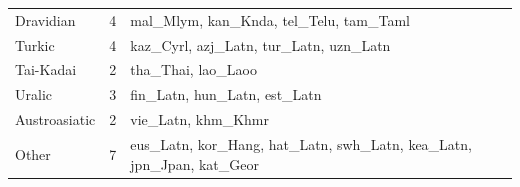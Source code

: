 \begin{table}[tbp]
{\begin{tabular}{@{}lcl@{}}
Dravidian       & 4        & mal\_Mlym, kan\_Knda, tel\_Telu, tam\_Taml                                                                                                                                                                                                                                                                       \\
Turkic          & 4        & kaz\_Cyrl, azj\_Latn, tur\_Latn, uzn\_Latn                                                                                                                                                                                                                                                                        \\
Tai-Kadai       & 2        & tha\_Thai, lao\_Laoo                                                                                                                                                                                                                                                                                               \\
Uralic          & 3        & fin\_Latn, hun\_Latn, est\_Latn                                                                                                                                                                                                                                                                                  \\
Austroasiatic   & 2        & vie\_Latn, khm\_Khmr                                                                                                                                                                                                                                                                                                \\
Other           & 7        & eus\_Latn, kor\_Hang, hat\_Latn, swh\_Latn, kea\_Latn, jpn\_Jpan, kat\_Geor  \\
\bottomrule
\end{tabular}
}
\end{table}


